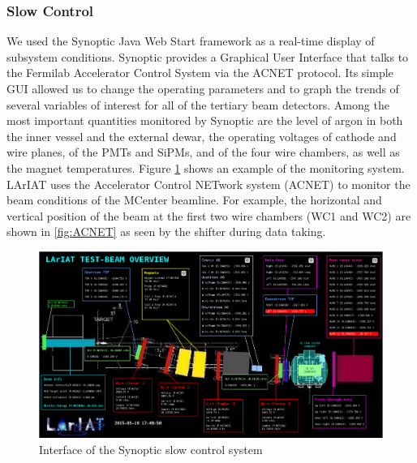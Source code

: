 \subsubsection{Slow Control}
We used the Synoptic Java Web Start framework \cite{Synoptic} as a real-time display of subsystem conditions. Synoptic provides a Graphical User Interface that talks to the Fermilab Accelerator Control System via the ACNET protocol. Its simple GUI allowed us to change the operating parameters and to graph the trends of several variables of interest for all of the tertiary beam detectors.  Among the most important quantities monitored by Synoptic are the level of argon in both the inner vessel and the external dewar, the operating voltages of cathode and wire planes, of the PMTs and SiPMs, and of the four wire chambers, as well as the magnet temperatures. Figure \ref{fig:synoptics} shows an example of the monitoring system.
LArIAT uses the Accelerator Control NETwork system (ACNET) to monitor the beam conditions of the MCenter beamline. For example, the horizontal and vertical position of the beam at the first two wire chambers (WC1 and WC2) are shown in \ref{fig:ACNET} as seen by the shifter during data taking. 

\begin{figure}[htb]
\centering
\includegraphics[width=\textwidth,height=\textheight,keepaspectratio]{Chapter-3/Images/BeamOverview.png}
\caption{Interface of the Synoptic slow control system}
\label{fig:synoptics}
\end{figure}

